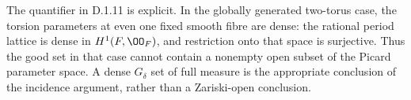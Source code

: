 The quantifier in D.1.11 is explicit. In the globally generated
two-torus case, the torsion parameters at even one fixed smooth fibre are
dense: the rational period lattice is dense in
$H^1(F,\OO_F)$, and restriction onto that space is surjective.
Thus the good set in that case cannot contain a nonempty open
subset of the Picard parameter space. A dense $G_\delta$ set of
full measure is the appropriate conclusion of the incidence
argument, rather than a Zariski-open conclusion.



